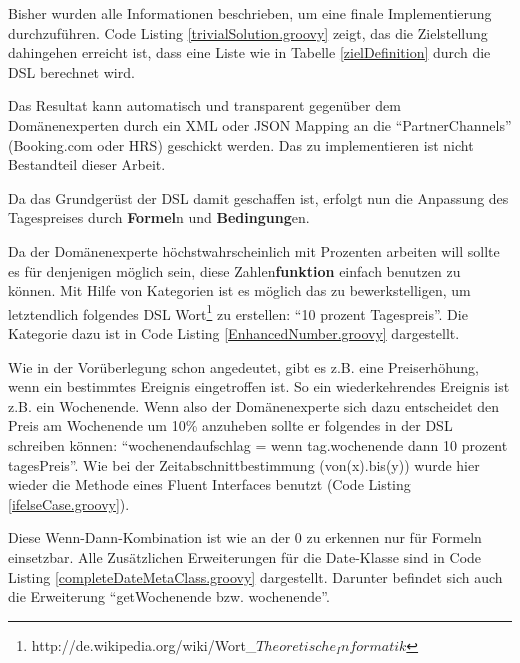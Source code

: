 \documentclass[11pt,english,ngerman, headsepline]{scrreprt}
\begin{document}
Bisher wurden alle Informationen beschrieben, um eine finale Implementierung
durchzuführen. Code Listing \ref{trivialSolution.groovy} zeigt, das die
Zielstellung dahingehen erreicht ist, dass eine Liste wie in Tabelle
\ref{zielDefinition} durch die DSL berechnet wird.
 


Das Resultat kann automatisch und transparent gegenüber dem Domänenexperten
durch ein XML oder JSON Mapping an die ``PartnerChannels'' (Booking.com oder HRS) geschickt werden.
Das zu implementieren ist nicht Bestandteil dieser Arbeit.

Da das Grundgerüst der DSL damit geschaffen ist, erfolgt nun die Anpassung des
Tagespreises durch {\bf Formel}n und {\bf Bedingung}en.

Da der Domänenexperte höchstwahrscheinlich mit Prozenten arbeiten will sollte
es für denjenigen möglich sein, diese Zahlen{\bf funktion} einfach benutzen zu
können. Mit Hilfe von Kategorien ist es möglich das zu bewerkstelligen, um
letztendlich folgendes DSL
Wort\footnote{http://de.wikipedia.org/wiki/Wort\_\(Theoretische_Informatik\)}
zu erstellen: ``10 prozent Tagespreis''. Die Kategorie dazu ist in Code Listing
\ref{EnhancedNumber.groovy} dargestellt.
 


Wie in der Vorüberlegung schon angedeutet, gibt es z.B. eine Preiserhöhung, wenn
ein bestimmtes Ereignis eingetroffen ist. So ein wiederkehrendes
Ereignis ist z.B. ein Wochenende. Wenn also der Domänenexperte sich dazu
entscheidet den Preis am Wochenende um 10\% anzuheben sollte er folgendes in der
DSL schreiben können: ``wochenendaufschlag = wenn tag.wochenende dann 10 prozent
tagesPreis''. Wie
bei der Zeitabschnittbestimmung (von(x).bis(y)) wurde hier wieder die Methode
eines Fluent Interfaces benutzt (Code Listing
\ref{ifelseCase.groovy}).
 


Diese Wenn-Dann-Kombination ist wie an der 0 zu erkennen nur für Formeln
einsetzbar. 
Alle Zusätzlichen Erweiterungen für die Date-Klasse sind in Code Listing
\ref{completeDateMetaClass.groovy} dargestellt. Darunter befindet sich auch die
Erweiterung ``getWochenende bzw. wochenende''.
\end{document}

